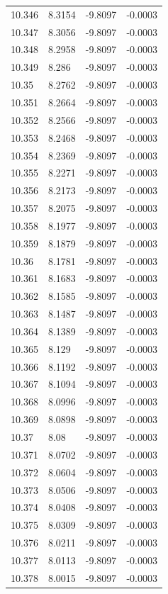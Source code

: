 \begin{tabular}{llll}
10.346 & 8.3154 & -9.8097 & -0.0003 \\
10.347 & 8.3056 & -9.8097 & -0.0003 \\
10.348 & 8.2958 & -9.8097 & -0.0003 \\
10.349 & 8.286 & -9.8097 & -0.0003 \\
10.35 & 8.2762 & -9.8097 & -0.0003 \\
10.351 & 8.2664 & -9.8097 & -0.0003 \\
10.352 & 8.2566 & -9.8097 & -0.0003 \\
10.353 & 8.2468 & -9.8097 & -0.0003 \\
10.354 & 8.2369 & -9.8097 & -0.0003 \\
10.355 & 8.2271 & -9.8097 & -0.0003 \\
10.356 & 8.2173 & -9.8097 & -0.0003 \\
10.357 & 8.2075 & -9.8097 & -0.0003 \\
10.358 & 8.1977 & -9.8097 & -0.0003 \\
10.359 & 8.1879 & -9.8097 & -0.0003 \\
10.36 & 8.1781 & -9.8097 & -0.0003 \\
10.361 & 8.1683 & -9.8097 & -0.0003 \\
10.362 & 8.1585 & -9.8097 & -0.0003 \\
10.363 & 8.1487 & -9.8097 & -0.0003 \\
10.364 & 8.1389 & -9.8097 & -0.0003 \\
10.365 & 8.129 & -9.8097 & -0.0003 \\
10.366 & 8.1192 & -9.8097 & -0.0003 \\
10.367 & 8.1094 & -9.8097 & -0.0003 \\
10.368 & 8.0996 & -9.8097 & -0.0003 \\
10.369 & 8.0898 & -9.8097 & -0.0003 \\
10.37 & 8.08 & -9.8097 & -0.0003 \\
10.371 & 8.0702 & -9.8097 & -0.0003 \\
10.372 & 8.0604 & -9.8097 & -0.0003 \\
10.373 & 8.0506 & -9.8097 & -0.0003 \\
10.374 & 8.0408 & -9.8097 & -0.0003 \\
10.375 & 8.0309 & -9.8097 & -0.0003 \\
10.376 & 8.0211 & -9.8097 & -0.0003 \\
10.377 & 8.0113 & -9.8097 & -0.0003 \\
10.378 & 8.0015 & -9.8097 & -0.0003 \\

\end{tabular}
